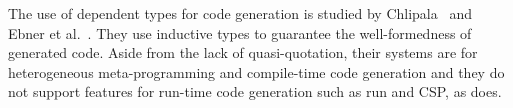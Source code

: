 




The use of dependent types for code generation is studied by
Chlipala~\cite{Chlipala2010Ur} and Ebner et
al.~\cite{DBLP:journals/pacmpl/EbnerURAM17}.  They use inductive types to
guarantee the well-formedness of generated code.  Aside from the lack of
quasi-quotation, their systems are for heterogeneous meta-programming and
compile-time code generation and they do not support features for run-time code
generation such as run and CSP, as \LMD{} does.



